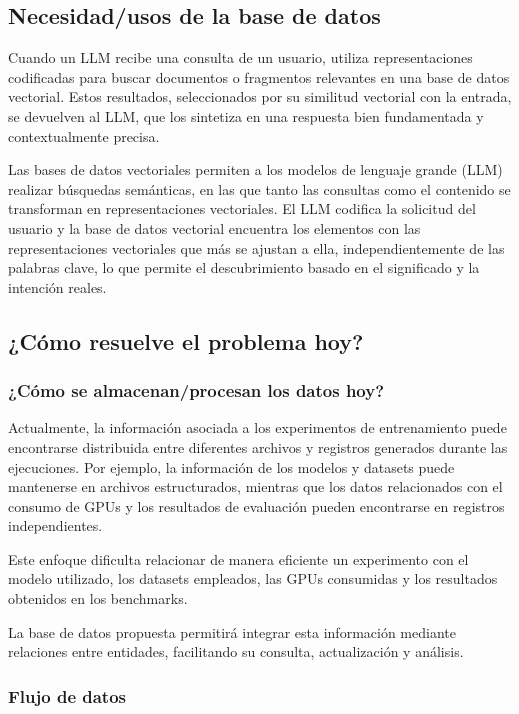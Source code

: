 \documentclass[12pt,a4paper]{article}
\begin{document}
\subsection{Necesidad/usos de la base de datos}

Cuando un LLM recibe una consulta de un usuario, utiliza representaciones codificadas para buscar documentos o fragmentos relevantes en una base de datos vectorial. Estos resultados, seleccionados por su similitud vectorial con la entrada, se devuelven al LLM, que los sintetiza en una respuesta bien fundamentada y contextualmente precisa.

Las bases de datos vectoriales permiten a los modelos de lenguaje grande (LLM) realizar búsquedas semánticas, en las que tanto las consultas como el contenido se transforman en representaciones vectoriales. El LLM codifica la solicitud del usuario y la base de datos vectorial encuentra los elementos con las representaciones vectoriales que más se ajustan a ella, independientemente de las palabras clave, lo que permite el descubrimiento basado en el significado y la intención reales.

\subsection{¿Cómo resuelve el problema hoy?}

\subsubsection{¿Cómo se almacenan/procesan los datos hoy?}

Actualmente, la información asociada a los experimentos de entrenamiento puede encontrarse distribuida entre diferentes archivos y registros generados durante las ejecuciones. Por ejemplo, la información de los modelos y datasets puede mantenerse en archivos estructurados, mientras que los datos relacionados con el consumo de GPUs y los resultados de evaluación pueden encontrarse en registros independientes.

Este enfoque dificulta relacionar de manera eficiente un experimento con el modelo utilizado, los datasets empleados, las GPUs consumidas y los resultados obtenidos en los benchmarks.

La base de datos propuesta permitirá integrar esta información mediante relaciones entre entidades, facilitando su consulta, actualización y análisis.

\subsubsection{Flujo de datos}
\end{document}
